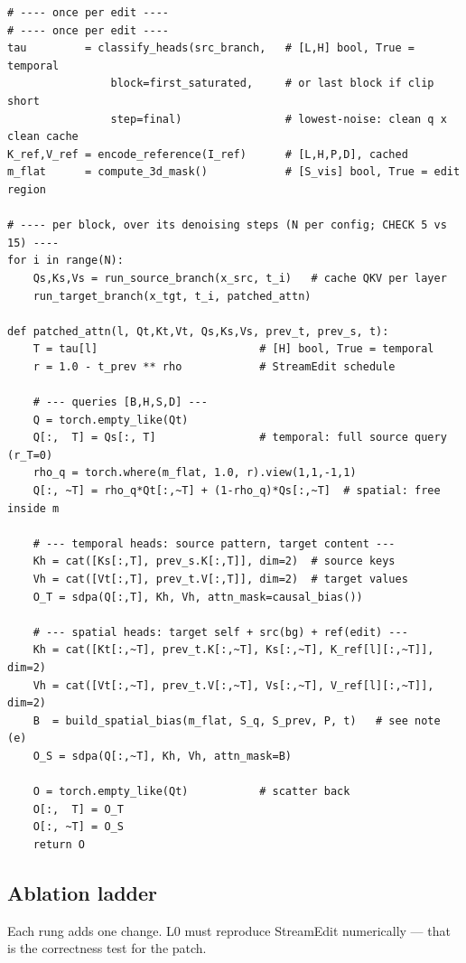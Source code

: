 \documentclass{article}
\begin{document}
{\small
\begin{verbatim}
# ---- once per edit ----
# ---- once per edit ----
tau         = classify_heads(src_branch,   # [L,H] bool, True = temporal
                block=first_saturated,     # or last block if clip short
                step=final)                # lowest-noise: clean q x clean cache
K_ref,V_ref = encode_reference(I_ref)      # [L,H,P,D], cached
m_flat      = compute_3d_mask()            # [S_vis] bool, True = edit region

# ---- per block, over its denoising steps (N per config; CHECK 5 vs 15) ----
for i in range(N):
    Qs,Ks,Vs = run_source_branch(x_src, t_i)   # cache QKV per layer
    run_target_branch(x_tgt, t_i, patched_attn)

def patched_attn(l, Qt,Kt,Vt, Qs,Ks,Vs, prev_t, prev_s, t):
    T = tau[l]                         # [H] bool, True = temporal
    r = 1.0 - t_prev ** rho            # StreamEdit schedule

    # --- queries [B,H,S,D] ---
    Q = torch.empty_like(Qt)
    Q[:,  T] = Qs[:, T]                # temporal: full source query (r_T=0)
    rho_q = torch.where(m_flat, 1.0, r).view(1,1,-1,1)
    Q[:, ~T] = rho_q*Qt[:,~T] + (1-rho_q)*Qs[:,~T]  # spatial: free inside m

    # --- temporal heads: source pattern, target content ---
    Kh = cat([Ks[:,T], prev_s.K[:,T]], dim=2)  # source keys
    Vh = cat([Vt[:,T], prev_t.V[:,T]], dim=2)  # target values
    O_T = sdpa(Q[:,T], Kh, Vh, attn_mask=causal_bias())

    # --- spatial heads: target self + src(bg) + ref(edit) ---
    Kh = cat([Kt[:,~T], prev_t.K[:,~T], Ks[:,~T], K_ref[l][:,~T]], dim=2)
    Vh = cat([Vt[:,~T], prev_t.V[:,~T], Vs[:,~T], V_ref[l][:,~T]], dim=2)
    B  = build_spatial_bias(m_flat, S_q, S_prev, P, t)   # see note (e)
    O_S = sdpa(Q[:,~T], Kh, Vh, attn_mask=B)

    O = torch.empty_like(Qt)           # scatter back
    O[:,  T] = O_T
    O[:, ~T] = O_S
    return O
\end{verbatim}
}

\subsection{Ablation ladder}

Each rung adds one change. L0 must reproduce StreamEdit numerically --- that is
the correctness test for the patch.
\end{document}
